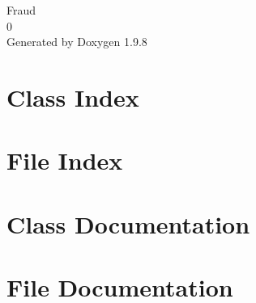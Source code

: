 \documentclass[twoside]{book}
\newcommand{\+}{\discretionary{\mbox{\scriptsize$\hookleftarrow$}}{}{}}
\newcommand{\clearemptydoublepage}{%
    \newpage{\pagestyle{empty}\cleardoublepage}%
  }
\begin{document}
  \raggedbottom
    \hypersetup{pageanchor=false,
                bookmarksnumbered=true,
                pdfencoding=unicode
               }
  \begin{titlepage}
  \vspace*{7cm}
  \begin{center}%
  {\Large Fraud}\\
  [1ex]\large 0 \\
  \vspace*{1cm}
  {\large Generated by Doxygen 1.9.8}\\
  \end{center}
  \end{titlepage}
  \clearemptydoublepage
  \tableofcontents
  \clearemptydoublepage
  \hypersetup{pageanchor=true}
\chapter{Class Index}

\chapter{File Index}

\chapter{Class Documentation}


\chapter{File Documentation}











  \backmatter
  \newpage
  \clearemptydoublepage
  \printindex
\end{document}
